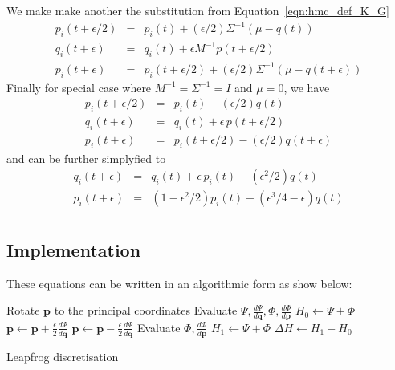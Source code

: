 We make make another the substitution from Equation~\ref{eqn:hmc_def_K_G}
\begin{eqnarray}
p_i (t+ \epsilon/2) &=& p_i(t) + (\epsilon/2)\Sigma^{-1}(\mu - q(t)) \\
q_i (t+\epsilon) &=& q_i(t) + \epsilon M^{-1}p(t+ \epsilon/2) \\
p_i (t+\epsilon) &=& p_i(t+ \epsilon/2) + (\epsilon/2)\Sigma^{-1}(\mu - q(t+ \epsilon))
\end{eqnarray}
Finally for special case where $M^{-1}=\Sigma^{-1}=I$ and $\mu=0$, we have
\begin{eqnarray}
p_i (t+ \epsilon/2) &=& p_i(t) - (\epsilon/2)q(t) \\
q_i (t+\epsilon) &=& q_i(t) + \epsilon\,p(t+ \epsilon/2) \\
p_i (t+\epsilon) &=& p_i(t+ \epsilon/2) - (\epsilon/2)q(t+ \epsilon)
\end{eqnarray}
and can be further simplyfied to 
\begin{eqnarray}
q_i (t+\epsilon) &=& q_i(t) + \epsilon\,p_i(t) -  (\epsilon^2/2)q(t)\\
p_i (t+\epsilon) &=& \left(1 - \epsilon^2/2\right)p_i(t) + \left( \epsilon^3/4 -\epsilon \right)q(t)\\
\end{eqnarray}

\subsection{Implementation}
These equations can be written in an algorithmic form as show below:
\begin{algorithm}
\BlankLine
Rotate $\mathbf{p}$ to the principal coordinates\;
Evaluate $\Psi,\frac{d\Psi}{d\mathbf{q}},\Phi,\frac{d\Phi}{d\mathbf{p}}$ \;
$H_0 \leftarrow \Psi+ \Phi$ \;
$ \mathbf{p} \leftarrow \mathbf{p} +  \frac{\epsilon}{2} \frac{d\Psi}{d\mathbf{q}}$\;
$ \mathbf{p} \leftarrow \mathbf{p} -  \frac{\epsilon}{2} \frac{d\Psi}{d\mathbf{q}}$\;
Evaluate $\Phi,\frac{d\Phi}{d\mathbf{p}}$ \;
$H_1 \leftarrow \Psi+ \Phi$ \;
$\Delta H  \leftarrow H_1-H_0$ \;
\caption{Leapfrog discretisation}\label{algo:hmc_leapfrog}
\end{algorithm}

